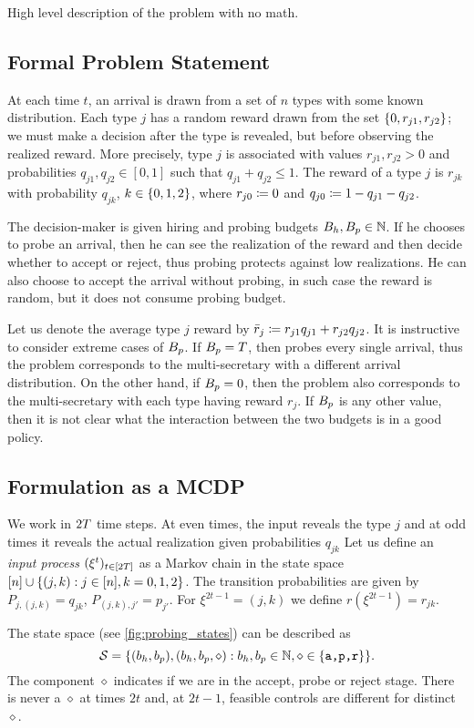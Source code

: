 High level description of the problem with no math. \todonote

\subsection{Formal Problem Statement}

At each time $t$, an arrival is drawn from a set of $n$ types with some known distribution.
Each type $j$ has a random reward drawn from the set $\{0,r_{j1},r_{j2}\}$; we must make a decision after the type is revealed, but before observing the realized reward.
More precisely, type $j$ is associated with values $r_{j1},r_{j2}>0$ and probabilities $q_{j1},q_{j2}\in[0,1]$ such that $q_{j1}+q_{j2}\leq 1$.
The reward of a type $j$ is $r_{jk}$ with probability $q_{jk}$, $k\in\{0,1,2\}$, where $r_{j0}\coloneqq 0$ and $q_{j0}\coloneqq 1-q_{j1}-q_{j2}$.

The decision-maker is given hiring and probing budgets $B_h,B_p\in\mathbb{N}$.
If he chooses to probe an arrival, then he can see the realization of the reward and then decide whether to accept or reject, thus probing protects against low realizations.
He can also choose to accept the arrival without probing, in such case the reward is random, but it does not consume probing budget.

Let us denote the average type $j$ reward by $\bar r_j\coloneqq r_{j1}q_{j1}+r_{j2}q_{j2}$.
It is instructive to consider extreme cases of $B_p$.
If $B_p=T$, then \onl probes every single arrival, thus the problem corresponds to the multi-secretary with a different arrival distribution.
On the other hand, if $B_p=0$, then the problem also corresponds to the multi-secretary with each type having reward $r_j$.
If $B_p$ is any other value, then it is not clear what the interaction between the two budgets is in a good policy.

\subsection{Formulation as a MCDP}
We work in $2T$ time steps.
At even times, the input reveals the type $j$ and at odd times it reveals the actual realization given probabilities $q_{jk}$
Let us define an \emph{input process} $(\xi^t)_{t\in[2T]}$ as a Markov chain in the state space $[n]\cup\{(j,k):j\in[n],k=0,1,2\}$.
The transition probabilities are given by $P_{j,(j,k)}=q_{jk}$, $P_{(j,k),j'}=p_{j'}$.
For $\xi^{2t-1}=(j,k)$ we define $r(\xi^{2t-1})=r_{jk}$.

The state space (see \cref{fig:probing_states}) can be described as  
\[
\mathcal{S}=\{(b_h,b_p),(b_h,b_p,\diamond):b_h,b_p\in\mathbb{N},\diamond\in \{\texttt{a,p,r}\}\}.
\]
The component $\diamond$ indicates if we are in the accept, probe or reject stage.
There is never a $\diamond$ at times $2t$ and, at $2t-1$, feasible controls are different for distinct $\diamond$.

